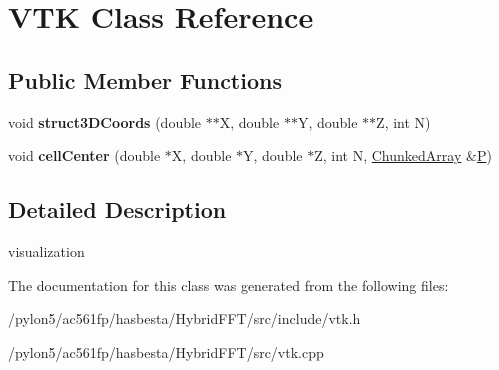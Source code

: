 \hypertarget{classVTK}{\section{V\-T\-K Class Reference}
\label{classVTK}
}
\subsection*{Public Member Functions}
\begin{DoxyCompactItemize}
\item 
\hypertarget{classVTK_aa54dc03118f5a2a875b91d29375e7825}{void {\bfseries struct3\-D\-Coords} (double $\ast$$\ast$X, double $\ast$$\ast$Y, double $\ast$$\ast$Z, int N)}\label{classVTK_aa54dc03118f5a2a875b91d29375e7825}

\item 
\hypertarget{classVTK_a8a94ac2a6c980ac3653413dffd3ead9e}{void {\bfseries cell\-Center} (double $\ast$X, double $\ast$Y, double $\ast$Z, int N, \hyperlink{classChunkedArray}{Chunked\-Array} \&\hyperlink{classP}{P})}\label{classVTK_a8a94ac2a6c980ac3653413dffd3ead9e}

\end{DoxyCompactItemize}


\subsection{Detailed Description}
visualization 

The documentation for this class was generated from the following files\-:\begin{DoxyCompactItemize}
\item 
/pylon5/ac561fp/hasbesta/\-Hybrid\-F\-F\-T/src/include/vtk.\-h\item 
/pylon5/ac561fp/hasbesta/\-Hybrid\-F\-F\-T/src/vtk.\-cpp\end{DoxyCompactItemize}
